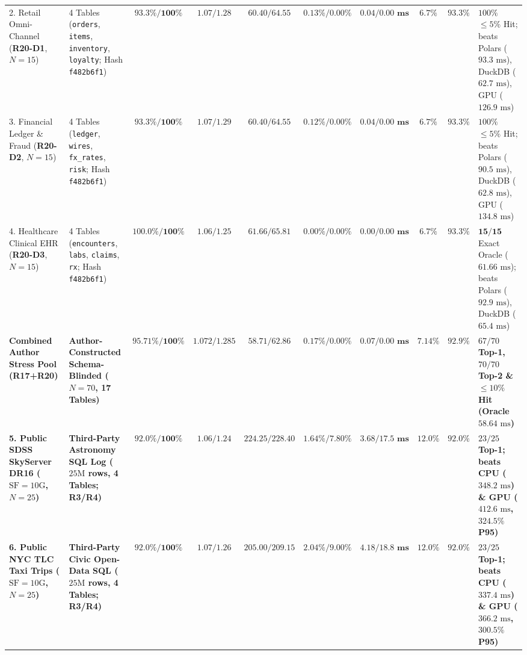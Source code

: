 \documentclass[10pt,a4paper]{article}
\newenvironment{fitasttable}{%
  \begin{lrbox}{\asttblbox}%
}{%
  \end{lrbox}%
  \sbox{\asttblboxB}{%
    \ifdim\wd\asttblbox>0.96\textwidth
      \resizebox{0.96\textwidth}{!}{\usebox{\asttblbox}}%
    \else
      \usebox{\asttblbox}%
    \fi
  }%
  \ifdim\ht\asttblboxB>0.72\textheight
    \resizebox{!}{0.72\textheight}{\usebox{\asttblboxB}}%
  \else
    \usebox{\asttblboxB}%
  \fi
}
\begin{document}
\begin{table}[!htbp]
\begin{fitasttable}
\begin{tabular}{@{}llcccccccl@{}}
2. Retail Omni-Channel (\textbf{R20-D1}, $N=15$) & 4 Tables (\texttt{orders}, \texttt{items}, \texttt{inventory}, \texttt{loyalty}; Hash \texttt{f482b6f1}) & $\mathbf{93.3\% / 100\%}$ & $\mathbf{1.07 / 1.28}$ & $\mathbf{60.40 / 64.55}$ & $\mathbf{0.13\% / 0.00\%}$ & $\mathbf{0.04 / 0.00\text{ ms}}$ & $6.7\%$ & $\mathbf{93.3\%}$ & $100\%$ $\le 5\%$ Hit; beats Polars ($93.3\text{ ms}$), DuckDB ($62.7\text{ ms}$), GPU ($126.9\text{ ms}$) \\
3. Financial Ledger \& Fraud (\textbf{R20-D2}, $N=15$) & 4 Tables (\texttt{ledger}, \texttt{wires}, \texttt{fx\_rates}, \texttt{risk}; Hash \texttt{f482b6f1}) & $\mathbf{93.3\% / 100\%}$ & $\mathbf{1.07 / 1.29}$ & $\mathbf{60.40 / 64.55}$ & $\mathbf{0.12\% / 0.00\%}$ & $\mathbf{0.04 / 0.00\text{ ms}}$ & $6.7\%$ & $\mathbf{93.3\%}$ & $100\%$ $\le 5\%$ Hit; beats Polars ($90.5\text{ ms}$), DuckDB ($62.8\text{ ms}$), GPU ($134.8\text{ ms}$) \\
4. Healthcare Clinical EHR (\textbf{R20-D3}, $N=15$) & 4 Tables (\texttt{encounters}, \texttt{labs}, \texttt{claims}, \texttt{rx}; Hash \texttt{f482b6f1}) & $\mathbf{100.0\% / 100\%}$ & $\mathbf{1.06 / 1.25}$ & $\mathbf{61.66 / 65.81}$ & $\mathbf{0.00\% / 0.00\%}$ & $\mathbf{0.00 / 0.00\text{ ms}}$ & $6.7\%$ & $\mathbf{93.3\%}$ & $\mathbf{15/15}$ Exact Oracle ($61.66\text{ ms}$); beats Polars ($92.9\text{ ms}$), DuckDB ($65.4\text{ ms}$) \\
\textbf{Combined Author Stress Pool (R17+R20)} & \textbf{Author-Constructed Schema-Blinded ($N=70$, 17 Tables)} & $\mathbf{95.71\% / 100\%}$ & $\mathbf{1.072 / 1.285}$ & $\mathbf{58.71 / 62.86}$ & $\mathbf{0.17\% / 0.00\%}$ & $\mathbf{0.07 / 0.00\text{ ms}}$ & $\mathbf{7.14\%}$ & $\mathbf{92.9\%}$ & \textbf{$67/70$ Top-1, $70/70$ Top-2 \& $\le 10\%$ Hit (Oracle $58.64\text{ ms}$)} \\
\textbf{5. Public SDSS SkyServer DR16 ($\text{SF}=10\text{G}$, $N=25$)} & \textbf{Third-Party Astronomy SQL Log ($25\text{M}$ rows, 4 Tables; R3/R4)} & $\mathbf{92.0\% / 100\%}$ & $\mathbf{1.06 / 1.24}$ & $\mathbf{224.25 / 228.40}$ & $\mathbf{1.64\% / 7.80\%}$ & $\mathbf{3.68 / 17.5\text{ ms}}$ & $12.0\%$ & $\mathbf{92.0\%}$ & \textbf{$23/25$ Top-1; beats CPU ($348.2\text{ ms}$) \& GPU ($412.6\text{ ms}$, $324.5\%$ P95)} \\
\textbf{6. Public NYC TLC Taxi Trips ($\text{SF}=10\text{G}$, $N=25$)} & \textbf{Third-Party Civic Open-Data SQL ($25\text{M}$ rows, 4 Tables; R3/R4)} & $\mathbf{92.0\% / 100\%}$ & $\mathbf{1.07 / 1.26}$ & $\mathbf{205.00 / 209.15}$ & $\mathbf{2.04\% / 9.00\%}$ & $\mathbf{4.18 / 18.8\text{ ms}}$ & $12.0\%$ & $\mathbf{92.0\%}$ & \textbf{$23/25$ Top-1; beats CPU ($337.4\text{ ms}$) \& GPU ($366.2\text{ ms}$, $300.5\%$ P95)} \\

\end{tabular}
\end{fitasttable}
\end{table}
\end{document}
